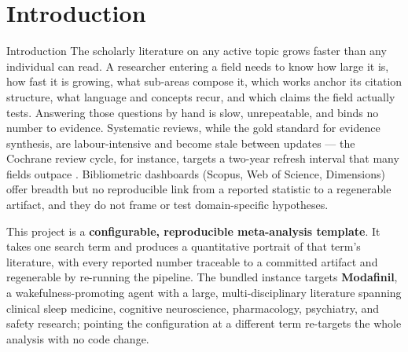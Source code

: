 \documentclass[
  ignorenonframetext,
]{beamer}
\author{\texorpdfstring{}{}}
\date{}
\begin{document}
\section{Introduction}\label{introduction}

\begin{frame}[allowframebreaks]{Introduction}
The scholarly literature on any active topic grows faster than any
individual can read. A researcher entering a field needs to know how
large it is, how fast it is growing, what sub-areas compose it, which
works anchor its citation structure, what language and concepts recur,
and which claims the field actually tests. Answering those questions by
hand is slow, unrepeatable, and binds no number to evidence. Systematic
reviews, while the gold standard for evidence synthesis, are
labour-intensive and become stale between updates --- the Cochrane
review cycle, for instance, targets a two-year refresh interval that
many fields outpace . Bibliometric dashboards
(Scopus, Web of Science, Dimensions) offer breadth but no reproducible
link from a reported statistic to a regenerable artifact, and they do
not frame or test domain-specific hypotheses.

This project is a \textbf{configurable, reproducible meta-analysis
template}. It takes one search term and produces a quantitative portrait
of that term's literature, with every reported number traceable to a
committed artifact and regenerable by re-running the pipeline. The
bundled instance targets \textbf{Modafinil}, a wakefulness-promoting
agent with a large, multi-disciplinary literature spanning clinical
sleep medicine, cognitive neuroscience, pharmacology, psychiatry, and
safety research; pointing the configuration at a different term
re-targets the whole analysis with no code change.
\end{frame}
\end{document}

